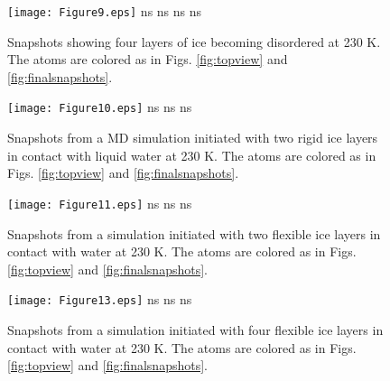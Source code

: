 \documentclass[preprint,aps,prb,floatfix]{revtex4-1}
\begin{document}
\clearpage
\begin{figure}
    \centering
   \texttt{[image: Figure9.eps]}\vspace{-0.8cm}
    ns  \quad\quad\quad\quad\quad\quad\quad{} ns \quad\quad\quad\quad\quad\quad\quad{} ns \quad\quad\quad\quad\quad\quad{} ns \\
    \caption{Snapshots showing four layers of ice becoming disordered at 230 K. The atoms are colored as in Figs. \ref{fig:topview} and \ref{fig:finalsnapshots}.}
    \label{fig:4icelayers}
\end{figure}

\clearpage
\begin{figure}
    \centering
    \texttt{[image: Figure10.eps]}\vspace{-0.7cm}
    \newline
    \quad{} ns       \quad\quad\quad\quad\quad\quad\quad\quad\quad\quad{} ns \quad\quad\quad\quad\quad\quad\quad\quad{} ns \\
    \caption{Snapshots from a MD simulation initiated with two rigid ice layers in contact with liquid water at 230 K. The atoms are colored as in Figs. \ref{fig:topview} and \ref{fig:finalsnapshots}.}
    \label{fig:2rigidicelayers}
\end{figure}

\clearpage
\begin{figure}
    \centering
    \texttt{[image: Figure11.eps]}\vspace{-0.65cm}
    \newline
    \quad{} ns       \quad\quad\quad\quad\quad\quad\quad\quad\quad{} ns \quad\quad\quad\quad\quad\quad\quad\quad\quad{} ns \\
    \caption{Snapshots from a simulation initiated with two flexible ice layers in contact with water at 230 K. The atoms are colored as in Figs. \ref{fig:topview} and \ref{fig:finalsnapshots}.}
    \label{fig:2flexibleicelayers}
\end{figure}

\clearpage
\begin{figure}
    \centering
    \texttt{[image: Figure13.eps]}\vspace{-0.89cm}
    \newline
    \quad{} ns       \quad\quad\quad\quad\quad\quad\quad\quad\quad{} ns \quad\quad\quad\quad\quad\quad\quad\quad\quad{} ns \\
    \caption{Snapshots from a simulation initiated with four flexible ice layers in contact with water at 230 K. The atoms are colored as in Figs. \ref{fig:topview} and \ref{fig:finalsnapshots}.}
    \label{fig:4flexibleicelayers}
\end{figure}
\end{document}
